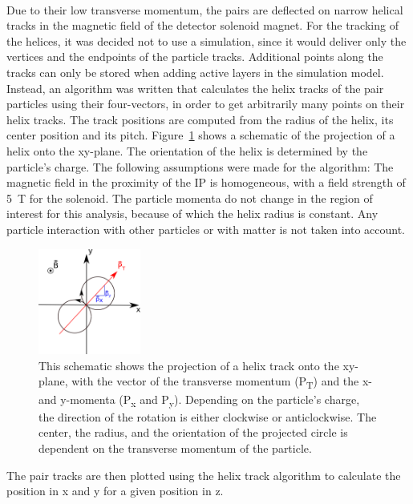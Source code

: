 \\Due to their low transverse momentum, the pairs are deflected on narrow helical tracks in the magnetic field of the detector solenoid magnet.
For the tracking of the helices, it was decided not to use a \geant simulation, since it would deliver only the vertices and the endpoints of the particle tracks.
Additional points along the tracks can only be stored when adding active layers in the simulation model.
Instead, an algorithm was written that calculates the helix tracks of the pair particles using their four-vectors, in order to get arbitrarily many points on their helix tracks. 
The track positions are computed from the radius of the helix, its center position and its pitch.
Figure~\ref{fig:helix_circle} shows a schematic of the projection of a helix onto the xy-plane.
The orientation of the helix is determined by the particle's charge.
The following assumptions were made for the algorithm:
The magnetic field in the proximity of the IP is homogeneous, with a field strength of \SI{5}{\tesla} for the \sid solenoid.
The particle momenta do not change in the region of interest for this analysis, because of which the helix radius is constant.
Any particle interaction with other particles or with matter is not taken into account.\\
\begin{figure}
    \centering
    \includegraphics[width=0.3\textwidth]{Figures/Pairs/Helix_explanation.png}
    \caption[Schematic projection of the helix on the xy-plane]{
    This schematic shows the projection of a helix track onto the xy-plane, with the vector of the transverse momentum (P\textsubscript{T}) and the x- and y-momenta (P\textsubscript{x} and P\textsubscript{y}).
    Depending on the particle's charge, the direction of the rotation is either clockwise or anticlockwise.
    The center, the radius, and the orientation of the projected circle is dependent on the transverse momentum of the particle.
    }
    \label{fig:helix_circle}
\end{figure}
The pair tracks are then plotted using the helix track algorithm to calculate the position in x and y for a given position in z.
